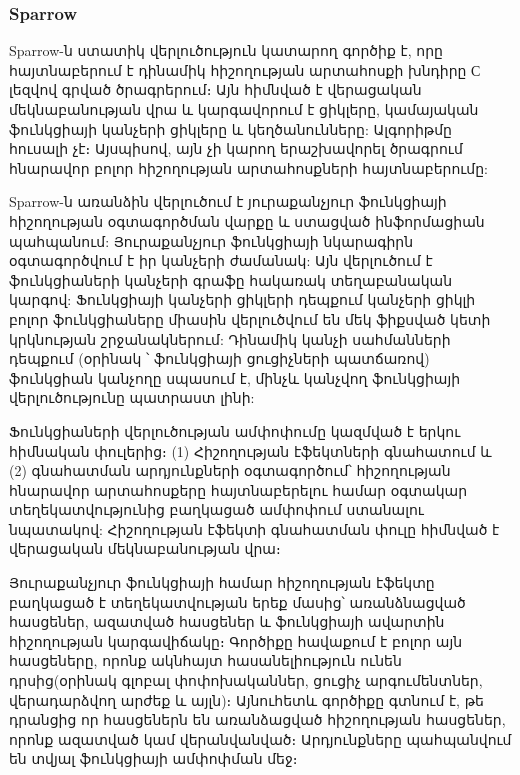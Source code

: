 \subsubsection{Sparrow}
Sparrow\cite{Jung2008}-ն ստատիկ վերլուծություն կատարող գործիք է, որը հայտնաբերում է դինամիկ հիշողության արտահոսքի խնդիրը
С լեզվով գրված ծրագրերում։ Այն հիմնված է վերացական մեկնաբանության վրա և կարգավորում է ցիկլերը, կամայական ֆունկցիայի
կանչերի ցիկլերը և կեղծանունները: Ալգորիթմը հուսալի չէ։ Այսպիսով, այն չի կարող երաշխավորել ծրագրում հնարավոր բոլոր
հիշողության արտահոսքների հայտնաբերումը:

Sparrow-ն առանձին վերլուծում է յուրաքանչյուր ֆունկցիայի հիշողության օգտագործման վարքը և ստացված ինֆորմացիան պահպանում:
Յուրաքանչյուր ֆունկցիայի նկարագիրն օգտագործվում է իր կանչերի ժամանակ: Այն վերլուծում է ֆունկցիաների կանչերի գրաֆը հակառակ
տեղաբանական կարգով: Ֆունկցիայի կանչերի ցիկլերի դեպքում կանչերի ցիկլի բոլոր ֆունկցիաները միասին վերլուծվում են մեկ ֆիքսված
կետի կրկնության շրջանակներում: Դինամիկ կանչի սահմանների դեպքում (օրինակ ՝ ֆունկցիայի ցուցիչների պատճառով) ֆունկցիան
կանչողը սպասում է, մինչև կանչվող ֆունկցիայի վերլուծությունը պատրաստ լինի:

Ֆունկցիաների վերլուծության ամփոփումը կազմված է երկու հիմնական փուլերից։ (1) Հիշողության էֆեկտների գնահատում և (2)
գնահատման արդյունքների օգտագործում՝ հիշողության հնարավոր արտահոսքերը հայտնաբերելու համար օգտակար տեղեկատվությունից
բաղկացած ամփոփում ստանալու նպատակով: Հիշողության էֆեկտի գնահատման փուլը հիմնված է վերացական մեկնաբանության վրա։

Յուրաքանչյուր ֆունկցիայի համար հիշողության էֆեկտը բաղկացած է տեղեկատվության երեք մասից՝ առանձնացված հասցեներ, ազատված
հասցեներ և ֆունկցիայի ավարտին հիշողության կարգավիճակը։ Գործիքը հավաքում է բոլոր այն հասցեները, որոնք ակնհայտ
հասանելիություն ունեն դրսից(օրինակ գլոբալ փոփոխականներ, ցուցիչ արգումենտներ, վերադարձվող արժեք և այլն)։ Այնուհետև
գործիքը գտնում է, թե դրանցից որ հասցեներն են առանձացված հիշողության հասցեներ, որոնք ազատված կամ վերանվանված։ Արդյունքները
պահպանվում են տվյալ ֆունկցիայի ամփոփման մեջ։

